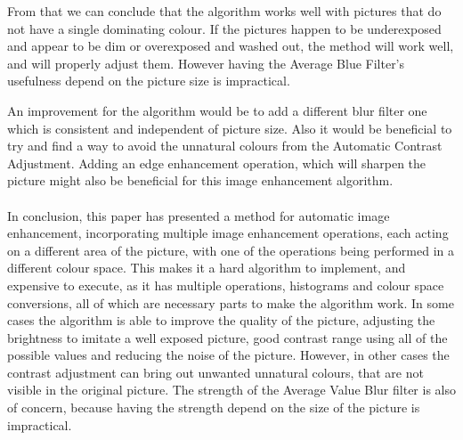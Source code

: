 \documentclass[journal,transmag]{IEEEtran}
\begin{document}
From that we can conclude that the algorithm works well with pictures that do not have a single dominating colour. If the pictures happen to be underexposed and appear to be dim or overexposed and washed out, the method will work well, and will properly adjust them. However having the Average Blue Filter's usefulness depend on the picture size is impractical. 

An improvement for the algorithm would be to add a different blur filter one which is consistent and independent of picture size. Also it would be beneficial to try and find a way to avoid the unnatural colours from the Automatic Contrast Adjustment. Adding an edge enhancement operation, which will sharpen the picture might also be beneficial for this image enhancement algorithm. %
\\
\\
In conclusion, this paper has presented a method for automatic image enhancement, incorporating multiple image enhancement operations, each acting on a different area of the picture, with one of the operations being performed in a different colour space. This makes it a hard algorithm to implement, and expensive to execute, as it has multiple operations, histograms and colour space conversions, all of which are necessary parts to make the algorithm work. In some cases the algorithm is able to improve the quality of the picture, adjusting the brightness to imitate a well exposed picture, good contrast range using all of the possible values and reducing the noise of the picture. However, in other cases the contrast adjustment can bring out unwanted unnatural colours, that are not visible in the original picture. The strength of the Average Value Blur filter is also of concern, because having the strength depend on the size of the picture is impractical.





\end{document}
